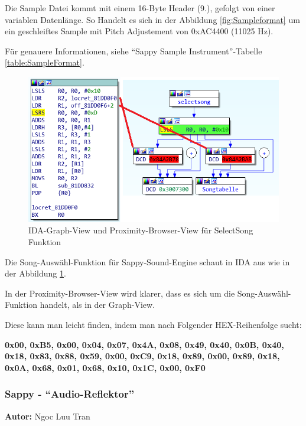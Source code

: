 \documentclass[11pt,a4paper]{scrartcl}
\newcommand{\AutorNgoc} {
    \vspace{-4mm}
    \large \textbf{Autor:} Ngoc Luu Tran \normalsize
    \vspace{2mm}
}
\begin{document}
Die Sample Datei kommt mit einem 16-Byte Header (9.), gefolgt von einer variablen Datenl\"ange. So Handelt es sich in der Abbildung \ref{fig:Sampleformat} um ein geschleiftes Sample mit Pitch Adjustement
von 0xAC4400 (11025 Hz).

F\"ur genauere Informationen, siehe "`Sappy Sample Instrument"'-Tabelle \ref{table:SampleFormat}.

\vspace{15pt}
\begin{figure}
	\vspace{-10pt}
	\centering
		\includegraphics[width=0.75\linewidth]{SelectSong}
	\vspace{-10pt}
	\caption{IDA-Graph-View und Proximity-Browser-View f\"ur SelectSong Funktion}
	\label{fig:SelectSong}
\end{figure}

Die Song-Ausw\"ahl-Funktion f\"ur Sappy-Sound-Engine schaut in IDA aus wie in der Abbildung \ref{fig:SelectSong}. 

In der Proximity-Browser-View wird klarer, dass es sich um die Song-Ausw\"ahl-Funktion handelt, als in der Graph-View.

Diese kann man leicht finden, indem man nach Folgender HEX-Reihenfolge sucht:

\textbf{0x00, 0xB5, 0x00, 0x04, 0x07, 0x4A, 0x08, 0x49,
0x40, 0x0B, 0x40, 0x18, 0x83, 0x88, 0x59, 0x00,
0xC9, 0x18, 0x89, 0x00, 0x89, 0x18, 0x0A, 0x68,
0x01, 0x68, 0x10, 0x1C, 0x00, 0xF0}

\newpage

\subsubsection{Sappy - \enquote{Audio-Reflektor}}
\AutorNgoc
\end{document}
